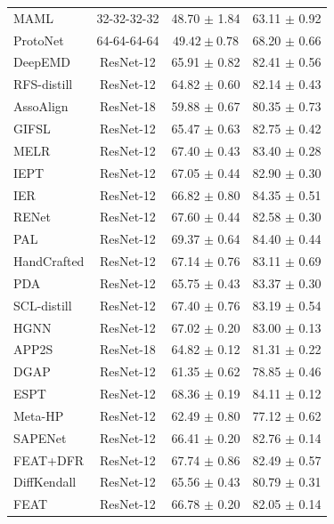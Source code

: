 {\begin{xltabular}{\textwidth}{lCCC}
MAML \cite{MAML} & 32-32-32-32 & 48.70 $\pm$ 1.84 & 63.11 $\pm$ 0.92 \\
ProtoNet \cite{ProtoNet} & 64-64-64-64 & $ 49.42 \pm 0.78 $ & 68.20 $\pm$ 0.66 \\
DeepEMD \cite{DeepEMD} & ResNet-12 & 65.91 $\pm$ 0.82 & 82.41 $\pm$ 0.56 \\
RFS-distill \cite{RFS} & ResNet-12 & 64.82 $\pm$ 0.60 & 82.14 $\pm$ 0.43 \\
AssoAlign \cite{AssoAlign} & ResNet-18 & 59.88 $\pm$ 0.67 & 80.35 $\pm$ 0.73 \\
GIFSL \cite{GIFSL} & ResNet-12 & 65.47 $\pm$ 0.63 & 82.75 $\pm$ 0.42 \\
MELR \cite{MELR} & ResNet-12 & 67.40 $\pm$ 0.43 & 83.40 $\pm$ 0.28\\
IEPT \cite{IEPT} & ResNet-12 & 67.05 $\pm$ 0.44 & 82.90 $\pm$ 0.30 \\
IER \cite{IER} & ResNet-12 & 66.82 $\pm$ 0.80 & 84.35 $\pm$ 0.51 \\
RENet \cite{RENet} & ResNet-12 & 67.60 $\pm$ 0.44 & 82.58 $\pm$ 0.30 \\
PAL \cite{PAL} & ResNet-12 & 69.37 $\pm$ 0.64 & 84.40 $\pm$ 0.44 \\
HandCrafted \cite{HandCrafted} & ResNet-12 & 67.14 $\pm$ 0.76 & 83.11 $\pm$ 0.69 \\
PDA \cite{PDA} & ResNet-12 & 65.75 $\pm$ 0.43 & 83.37 $\pm$ 0.30 \\
SCL-distill \cite{Spatial} & ResNet-12 & 67.40 $\pm$ 0.76 & 83.19 $\pm$ 0.54 \\
HGNN \cite{HGNN} & ResNet-12 & 67.02 $\pm$ 0.20 & 83.00 $\pm$ 0.13 \\
APP2S \cite{APP2S} & ResNet-18 & 64.82 $\pm$ 0.12 & 81.31 $\pm$ 0.22 \\
DGAP \cite{DGAP} & ResNet-12 & 61.35 $\pm$ 0.62 & 78.85 $\pm$ 0.46 \\
ESPT \cite{ESPT} & ResNet-12 & 68.36 $\pm$ 0.19 & 84.11 $\pm$ 0.12 \\
Meta-HP \cite{Meta-HP} & ResNet-12 & 62.49 $\pm$ 0.80 & 77.12 $\pm$ 0.62 \\
SAPENet \cite{SAPENet} & ResNet-12 & 66.41 $\pm$ 0.20 & 82.76 $\pm$ 0.14 \\
FEAT+DFR \cite{DFR} & ResNet-12 & 67.74 $\pm$ 0.86 & 82.49 $\pm$ 0.57 \\
DiffKendall \cite{DiffKendall} & ResNet-12 & 65.56 $\pm$ 0.43 & 80.79 $\pm$ 0.31 \\
\midrule
FEAT \cite{FEAT} & ResNet-12 & 66.78 $\pm$ 0.20 & 82.05 $\pm$ 0.14 \\

\end{xltabular}}
